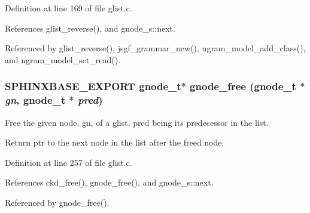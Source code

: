 Definition at line 169 of file glist.c.

References glist\_\-reverse(), and gnode\_\-s::next.

Referenced by glist\_\-reverse(), jsgf\_\-grammar\_\-new(), ngram\_\-model\_\-add\_\-class(), and ngram\_\-model\_\-set\_\-read().
\subsubsection[{gnode\_\-free}]{\setlength{\rightskip}{0pt plus 5cm}SPHINXBASE\_\-EXPORT {\bf gnode\_\-t}$\ast$ gnode\_\-free ({\bf gnode\_\-t} $\ast$ {\em gn}, \/  {\bf gnode\_\-t} $\ast$ {\em pred})}\label{glist_8h_68b51aea4de463b284a19668a713d502}


Free the given node, gn, of a glist, pred being its predecessor in the list. 

Return ptr to the next node in the list after the freed node. 

Definition at line 257 of file glist.c.

References ckd\_\-free(), gnode\_\-free(), and gnode\_\-s::next.

Referenced by gnode\_\-free().